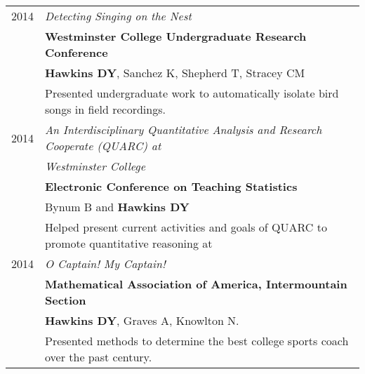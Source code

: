 \documentclass[a4paper,10pt]{report}
\begin{document}
\begin{longtable}{rp{11cm}}
	\textsc{2014} & \emph{Detecting Singing on the Nest}                                                                                   \\
	              & \textbf{Westminster College Undergraduate Research Conference}                                                         \\
	              & \footnotesize \textbf{Hawkins DY}, Sanchez K, Shepherd T, Stracey CM                                                   \\
	              & \small{
		Presented undergraduate work to automatically isolate bird songs in
	field recordings.}                                                                                                                     \\

	\textsc{2014} & \emph{An Interdisciplinary Quantitative Analysis and Research Cooperate (QUARC) at}                                    \\
	              & \emph{Westminster College}                                                                                             \\
	              & \textbf{Electronic Conference on Teaching Statistics}                                                                  \\
	              & \footnotesize Bynum B and \textbf{Hawkins DY}                                                                          \\
	              & \small{Helped present current activities and goals of QUARC to promote quantitative reasoning at}                      \\

	\textsc{2014} & \emph{O Captain! My Captain!}                                                                                          \\
	              & \textbf{Mathematical Association of America, Intermountain Section}                                                    \\
	              & \footnotesize \textbf{Hawkins DY}, Graves A, Knowlton N.                                                               \\
	              & \small{Presented methods to determine the best college sports coach over
	the past century.}                                                                                                                     \\


\end{longtable}
\end{document}
